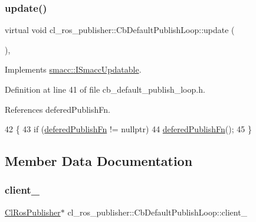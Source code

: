 \subsubsection{\texorpdfstring{update()}{update()}}
{\footnotesize\ttfamily virtual void cl\+\_\+ros\+\_\+publisher\+::\+Cb\+Default\+Publish\+Loop\+::update (\begin{DoxyParamCaption}{ }\end{DoxyParamCaption})\hspace{0.3cm}{\ttfamily [inline]}, {\ttfamily [virtual]}}



Implements \hyperlink{classsmacc_1_1ISmaccUpdatable_a84ee0520cbefdb1d412bed54650b028e}{smacc\+::\+I\+Smacc\+Updatable}.



Definition at line 41 of file cb\+\_\+default\+\_\+publish\+\_\+loop.\+h.



References defered\+Publish\+Fn.


\begin{DoxyCode}
42     \{
43         \textcolor{keywordflow}{if} (\hyperlink{classcl__ros__publisher_1_1CbDefaultPublishLoop_ac0044704637edbd8f79a69d5b06de9ba}{deferedPublishFn} != \textcolor{keyword}{nullptr})
44             \hyperlink{classcl__ros__publisher_1_1CbDefaultPublishLoop_ac0044704637edbd8f79a69d5b06de9ba}{deferedPublishFn}();
45     \}
\end{DoxyCode}


\subsection{Member Data Documentation}
\mbox{\label{classcl__ros__publisher_1_1CbDefaultPublishLoop_a483b8c34b88dadc718fbf4bf1f95acb5}} 
\subsubsection{\texorpdfstring{client\+\_\+}{client\_}}
{\footnotesize\ttfamily \hyperlink{classcl__ros__publisher_1_1ClRosPublisher}{Cl\+Ros\+Publisher}$\ast$ cl\+\_\+ros\+\_\+publisher\+::\+Cb\+Default\+Publish\+Loop\+::client\+\_\+\hspace{0.3cm}{\ttfamily [private]}}



